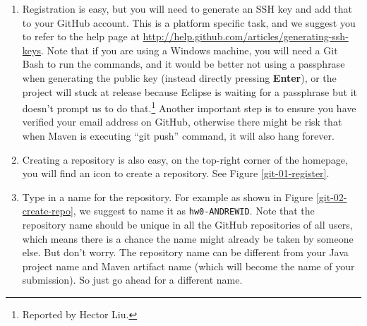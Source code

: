 \begin{enumerate}
\item Registration is easy, but you will need to generate an SSH key and add that to your GitHub account. This is a platform specific task, and we suggest you to refer to the help page at \url{http://help.github.com/articles/generating-ssh-keys}. Note that if you are using a Windows machine, you will need a Git Bash to run the commands, and it would be better not using a passphrase when generating the public key (instead directly pressing \textbf{Enter}), or the project will stuck at release because Eclipse is waiting for a passphrase but it doesn't prompt us to do that.\footnote{Reported by Hector Liu.} Another important step is to ensure you have verified your email address on GitHub, otherwise there might be risk that when Maven is executing ``git push'' command, it will also hang forever.


\item Creating a repository is also easy, on the top-right corner of the homepage, you will find an icon to create a repository. See Figure \ref{git-01-register}.

\item Type in a name for the repository. For example as shown in Figure \ref{git-02-create-repo}, we suggest to name it as \texttt{hw0-ANDREWID}. Note that the repository name should be unique in all the GitHub repositories of all users, which means there is a chance the name might already be taken by someone else. But don't worry. The repository name can be different from your Java project name and Maven artifact name (which will become the name of your submission). So just go ahead for a different name.


\end{enumerate}
